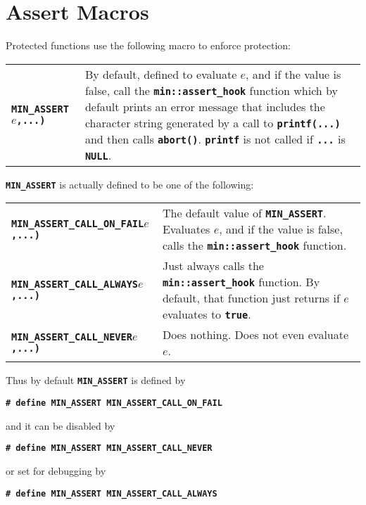 \documentclass[12pt]{article}
\makeatletter
\newcommand{\TT}[1]{{\tt \bfseries #1}}
\newcommand{\ttkey}[1]{\TT{#1}\index{#1@{\tt #1}}}
\newcommand{\EOL}{\penalty \exhyphenpenalty}
\newenvironment{indpar}[1][0.3in]%
	{\begin{list}{}%
		     {\setlength{\itemsep}{0in}%
		      \setlength{\topsep}{0in}%
		      \setlength{\parsep}{1ex}%
		      \setlength{\labelwidth}{#1}%
		      \setlength{\leftmargin}{#1}%
		      \addtolength{\leftmargin}{\labelsep}}%
	 \item}%
	{\end{list}}
\newcommand{\LABEL}[1]{\label{#1}}
\newcommand{\TTKEY}[1]{\ttkey{#1}}
\makeatother
\begin{document}
\section{Assert Macros}
\label{ASSERT_MACROS}

Protected functions use the following macro to enforce protection:

\begin{indpar}\begin{tabular}{lp{4.0in}}
\TTKEY{MIN\_ASSERT}\TT{(}$e$\TT{,...)}
	& By default, defined to evaluate $e$, and if the value is
	  false, call the \TT{min::\EOL assert\_\EOL hook} function which
	  by default prints an error message that includes the
	  character string generated by a call to
	  \TT{printf(...)} and then calls \TT{abort()}.
	  \TT{printf} is not called if \TT{...} is \TT{NULL}.
\LABEL{MIN_ASSERT} \\
\end{tabular}\end{indpar}

\TT{MIN\_ASSERT} is actually defined to be one of the following:
\begin{indpar}\begin{tabular}{lp{3.0in}}
\TTKEY{MIN\_ASSERT\_CALL\_ON\_FAIL}\TT{(}$e$\TT{,...)}
	& The default value of \TT{MIN\_ASSERT}.
	  Evaluates $e$, and if the value is
	  false, calls the \TT{min::\EOL assert\_\EOL hook} function.
\LABEL{MIN_ASSERT_CALL_ON_FAIL} \\
\TTKEY{MIN\_ASSERT\_CALL\_ALWAYS}\TT{(}$e$\TT{,...)}
	& Just always calls the \TT{min::\EOL assert\_\EOL hook} function.
	  By default,
	  that function just returns if $e$ evaluates to \TT{true}.
\LABEL{MIN_ASSERT_CALL_ALWAYS} \\
\TTKEY{MIN\_ASSERT\_CALL\_NEVER}\TT{(}$e$\TT{,...)}
	& Does nothing.  Does not even evaluate $e$.
\LABEL{MIN_ASSERT_CALL_NEVER} \\
\end{tabular}\end{indpar}

Thus by default \TT{MIN\_ASSERT} is defined by
\begin{center}
\TT{\# define MIN\_ASSERT MIN\_ASSERT\_CALL\_ON\_FAIL}
\end{center}
and it can be disabled by
\begin{center}
\TT{\# define MIN\_ASSERT MIN\_ASSERT\_CALL\_NEVER}
\end{center}
or set for debugging by
\begin{center}
\TT{\# define MIN\_ASSERT MIN\_ASSERT\_CALL\_ALWAYS}
\end{center}
\end{document}
